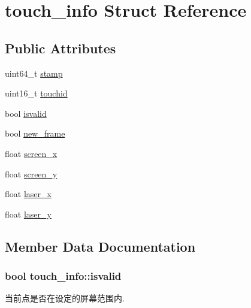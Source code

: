 \hypertarget{structtouch__info}{}\section{touch\+\_\+info Struct Reference}
\label{structtouch__info}
\subsection*{Public Attributes}
\begin{DoxyCompactItemize}
\item 
uint64\+\_\+t \hyperlink{structtouch__info_a6ee6ed6d0b734d51e32824e254be4866}{stamp}
\item 
uint16\+\_\+t \hyperlink{structtouch__info_a70be44e377e02cec5b4ecbb1c63f77dd}{touchid}
\item 
bool \hyperlink{structtouch__info_ad9c0bc30d781171b7f61a57de7df0ec9}{isvalid}
\item 
bool \hyperlink{structtouch__info_a3fe96c6e49b718988829f9224bb482ff}{new\+\_\+frame}
\item 
float \hyperlink{structtouch__info_a0e392d11daede4a08a414c882b4bd7ff}{screen\+\_\+x}
\item 
float \hyperlink{structtouch__info_a1f9496ba80ef2bf04292148b327e3a6a}{screen\+\_\+y}
\item 
float \hyperlink{structtouch__info_a8978922f7e70732e5a096948ecc14f1c}{laser\+\_\+x}
\item 
float \hyperlink{structtouch__info_a0681e323236f958c18ea8d41f8610496}{laser\+\_\+y}
\end{DoxyCompactItemize}


\subsection{Member Data Documentation}
\subsubsection[{\texorpdfstring{isvalid}{isvalid}}]{\setlength{\rightskip}{0pt plus 5cm}bool touch\+\_\+info\+::isvalid}\hypertarget{structtouch__info_ad9c0bc30d781171b7f61a57de7df0ec9}{}\label{structtouch__info_ad9c0bc30d781171b7f61a57de7df0ec9}
当前点是否在设定的屏幕范围内. 
